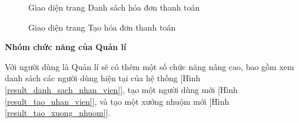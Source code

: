 \begin{figure}[H]
    \begin{center}
        \caption{Giao diện trang Danh sách hóa đơn thanh toán}
        \label{result_danh_sach_hoa_don_thanh_toan}
    \end{center}
\end{figure}

\begin{figure}[H]
    \begin{center}
        \caption{Giao diện trang Tạo hóa đơn thanh toán}
        \label{result_tao_hoa_don_thanh_toan}
    \end{center}
\end{figure}

\textbf{Nhóm chức năng của Quản lí}

Với người dùng là Quản lí sẽ có thêm một số chức năng nâng cao, bao gồm xem danh sách các người dùng hiện tại của hệ thống [Hình \ref{result_danh_sach_nhan_vien}], tạo một người dùng mới [Hình \ref{result_tao_nhan_vien}], và tạo một xưởng nhuộm mới [Hình \ref{result_tao_xuong_nhuom}].

